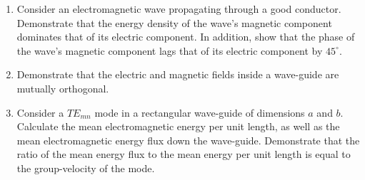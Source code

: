 {\begin{enumerate}
of glass of refractive index $n$ at the Brewster angle. Demonstrate that the refracted ray
is also incident on the rear (glass/air) interface of the pane at the Brewster
angle.
\item Consider an electromagnetic wave propagating through a good conductor. Demonstrate that the energy density of the wave's magnetic component dominates that of its electric component. In addition, show that the phase
of the wave's magnetic component  lags that of its electric component by
$45^\circ$. 
\item Demonstrate that the electric and magnetic fields inside a wave-guide are mutually orthogonal.
\item Consider a $TE_{mn}$ mode in a rectangular wave-guide of dimensions
$a$ and $b$. Calculate the mean electromagnetic energy per unit length, as
well as
the mean electromagnetic energy flux down the wave-guide. Demonstrate
that the ratio of the mean energy flux to the mean energy per unit length
is equal to the group-velocity of the mode.

\end{enumerate}
\renewcommand{\theenumi}{arabic{enumi}}
}
